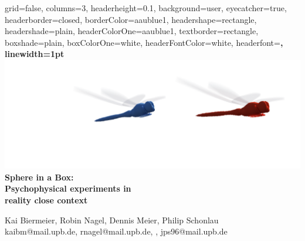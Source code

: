 \documentclass[a0paper,portrait]{baposter}
\begin{document}

\begin{poster}{
  grid=false,
  columns=3,
  headerheight=0.1\textheight,
  background=user,
  eyecatcher=true,
  headerborder=closed,
  borderColor=aaublue1,
  headershape=rectangle,
  headershade=plain, %
  headerColorOne=aaublue1,
  textborder=rectangle,
  boxshade=plain,
  boxColorOne=white,
  headerFontColor=white,
  headerfont=\Large\sf\bf,
  linewidth=1pt
}
{
 \vspace*{-1cm} \includegraphics[height=.9\headerheight]{UPB_Logo_WEISS_12_libellen2.pdf}
}
{\color{white}\bf\smaller
  Sphere in a Box: \\ 
  Psychophysical experiments in \\ reality close context
}
{\color{white}\small
\vspace*{-0.2cm}
  \vspace{1em}Kai Biermeier, Robin Nagel, Dennis Meier, Philip Schonlau\\
  {\smaller kaibm@mail.upb.de, rnagel@mail.upb.de, , jps96@mail.upb.de}
  
}
\end{poster}
\end{document}

